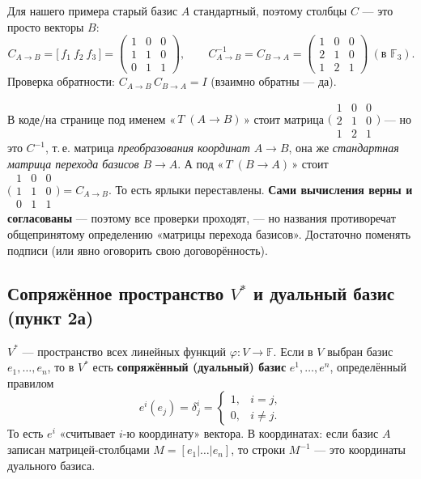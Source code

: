 \documentclass[11pt]{article}
\newcommand{\F}{\mathbb{F}}
\begin{document}
Для нашего примера старый базис $A$ стандартный, поэтому столбцы $C$ — это просто векторы
$B$:
\[
C_{A\to B}=\big[\,f_1\ f_2\ f_3\,\big]=
\begin{pmatrix}1&0&0\\1&1&0\\0&1&1\end{pmatrix},
\qquad
C_{A\to B}^{-1}=C_{B\to A}=
\begin{pmatrix}1&0&0\\2&1&0\\1&2&1\end{pmatrix}\ (\text{в }\F_3).
\]
Проверка обратности: $C_{A\to B}\,C_{B\to A}=I$ (взаимно обратны — да).

\begin{warnbox}
В коде/на странице под именем «\,$T\;(A\to B)$\,» стоит матрица
$\big(\begin{smallmatrix}1&0&0\\2&1&0\\1&2&1\end{smallmatrix}\big)$ — но это $C^{-1}$,
т.\,е. матрица \emph{преобразования координат} $A\!\to\!B$, она же \emph{стандартная
матрица перехода базисов} $B\to A$. А под «\,$T\;(B\to A)$\,» стоит
$\big(\begin{smallmatrix}1&0&0\\1&1&0\\0&1&1\end{smallmatrix}\big)=C_{A\to B}$.
То есть ярлыки переставлены. \textbf{Сами вычисления верны и согласованы} — поэтому все
проверки проходят, — но названия противоречат общепринятому определению «матрицы
перехода базисов». Достаточно поменять подписи (или явно оговорить свою договорённость).
\end{warnbox}

\subsection{Сопряжённое пространство $V^{*}$ и дуальный базис (пункт 2а)}

$V^{*}$ — пространство всех линейных функций $\varphi\colon V\to\F$. Если в $V$ выбран
базис $e_1,\dots,e_n$, то в $V^{*}$ есть \textbf{сопряжённый (дуальный) базис}
$e^1,\dots,e^n$, определённый правилом
\[
  e^{i}(e_j)=\delta^{i}_{j}=\begin{cases}1,& i=j,\\ 0,& i\neq j.\end{cases}
\]
То есть $e^{i}$ «считывает $i$-ю координату» вектора. В координатах: если базис $A$ записан
матрицей-столбцами $M=[e_1|\dots|e_n]$, то строки $M^{-1}$ — это координаты дуального
базиса.
\end{document}
